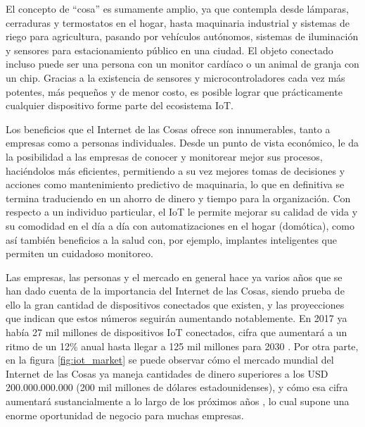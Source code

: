 El concepto de \enquote{cosa} es sumamente amplio, ya que contempla desde lámparas, cerraduras y termostatos en el hogar, hasta maquinaria industrial y sistemas de riego para agricultura, pasando por vehículos autónomos, sistemas de iluminación y sensores para estacionamiento público en una ciudad. El objeto conectado incluso puede ser una persona con un monitor cardíaco o un animal de granja con un chip. Gracias a la existencia de sensores y microcontroladores cada vez más potentes, más pequeños y de menor costo, es posible lograr que prácticamente cualquier dispositivo forme parte del ecosistema IoT.

Los beneficios que el Internet de las Cosas ofrece son innumerables, tanto a empresas como a personas individuales. Desde un punto de vista económico, le da la posibilidad a las empresas de conocer y monitorear mejor sus procesos, haciéndolos más eficientes, permitiendo a su vez mejores tomas de decisiones y acciones como mantenimiento predictivo de maquinaria, lo que en definitiva se termina traduciendo en un ahorro de dinero y tiempo para la organización. Con respecto a un individuo particular, el IoT le permite mejorar su calidad de vida y su comodidad en el día a día con automatizaciones en el hogar (domótica), como así también beneficios a la salud con, por ejemplo, implantes inteligentes que permiten un cuidadoso monitoreo.

Las empresas, las personas y el mercado en general hace ya varios años que se han dado cuenta de la importancia del Internet de las Cosas, siendo prueba de ello la gran cantidad de dispositivos conectados que existen, y las proyecciones que indican que estos números seguirán aumentando notablemente. En 2017 ya había 27 mil millones de dispositivos IoT conectados, cifra que aumentará a un ritmo de un 12\% anual hasta llegar a 125 mil millones para 2030 \citep{1}. Por otra parte, en la figura \ref{fig:iot_market} se puede observar cómo el mercado mundial del Internet de las Cosas ya maneja cantidades de dinero superiores a los USD 200.000.000.000 (200 mil millones de dólares estadounidenses), y cómo esa cifra aumentará sustancialmente a lo largo de los próximos años \citep{2}, lo cual supone una enorme oportunidad de negocio para muchas empresas.

